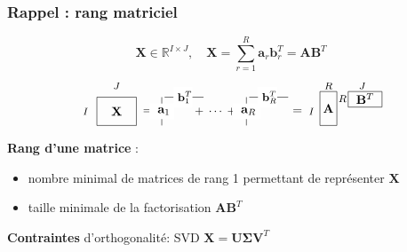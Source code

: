 \documentclass[9pt,table]{beamer} %
\newcommand{\bfa}{\mathbf{a}}
\newcommand{\bfb}{\mathbf{b}}
\begin{document}
\begin{frame}
\frametitle{Rappel : rang matriciel}
\[
\mathbf{X} \in \mathbb{R}^{I \times J}, \quad \mathbf{X} = \sum_{r=1}^R  \mathbf{a}_{r} \mathbf{b}_{r}^T = \mathbf{A} \mathbf{B}^T
\]
\[
\raisebox{-0.35\height}{\begin{tikzpicture}[scale=0.8]
\draw(0,0.5) node (A) {$\mathbf{X}$};
\draw(-1.1,0.5) node (eq) {\footnotesize ${I}$};
\draw(0,1.4) node (eq) {\footnotesize ${J}$};
\draw(-0.7,0) rectangle (0.7,1);
\draw(1.1,0.5) node (eq) {${=}$};
\draw(1.6,0) -- (1.6,1);
\draw(1.6,0.5) node[fill=white] (a1) {{ $\bfa_1$}};
\draw(1.7,1) -- (3.08,1);
\draw(2.35,1) node[fill=white] (b1) {{\small $\bfb_1^{T}\!\!$}};
\draw(3.5,0.5) node () {{\small $+\; \cdots\;+$}};
\draw(4.6,0) -- (4.6,1);
\draw(4.6,0.5) node[fill=white] (a1) {{ $\bfa_R$}};
\draw(4.7,1) -- (6.08,1);
\draw(5.35,1) node[fill=white] (b1) {{\small $\bfb_R^{T}\!\!$}};
\end{tikzpicture}}
\raisebox{-0.35\height}{\begin{tikzpicture}[scale=0.8]
\draw(1.2,0.5) node (eq) {$=$};

\draw(1.7,0.5) node (eq) {\footnotesize ${I}$};

\draw(2,0) rectangle (2.6,1.2); %
\draw(2.3,0.6) node (A) {$\mathbf{A}$};

\draw(2.3,1.4) node (eq) {\footnotesize ${R}$};
\draw(3.5,1.4) node (eq) {\footnotesize ${J}$};

\draw(3,0.65) rectangle (4.2,1.2); %
\draw(2.8,0.95) node (eq) {\footnotesize ${R}$};
\draw(3.6,0.95) node (A) {$\mathbf{B}^{T}$};
\end{tikzpicture}}
\]

\textbf{Rang d'une matrice} : 
\begin{itemize}
\item[1.] nombre minimal de matrices de rang 1 permettant de représenter $\mathbf{X}$
\item[2.] taille minimale de la factorisation $\mathbf{A} \mathbf{B}^T $
\end{itemize}

 \textbf{Contraintes} d'orthogonalité: SVD \quad $\mathbf{X} = \mathbf{U} \mathbf{\Sigma}\mathbf{V}^{T}$
\\[2ex]



\end{frame}
\end{document}
